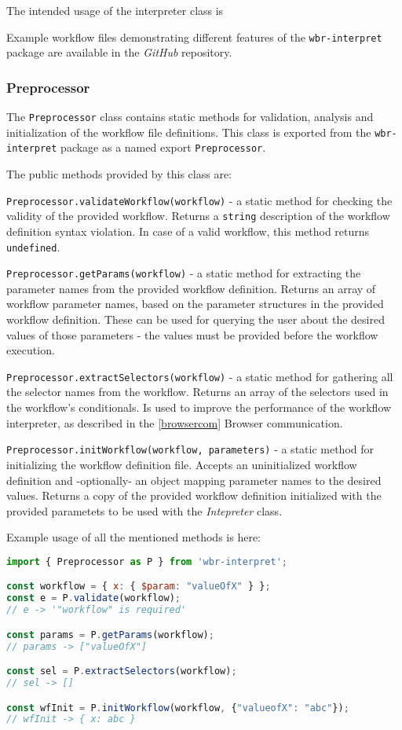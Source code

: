 The intended usage of the interpreter class is

Example workflow files demonstrating different features of the \texttt{wbr-interpret} package are available in the \textit{GitHub} repository.

\subsubsection{Preprocessor}

The \texttt{Preprocessor} class contains static methods for validation, analysis and initialization of the workflow file definitions.
This class is exported from the \texttt{wbr-interpret} package as a named export \texttt{Preprocessor}.

The public methods provided by this class are:
\smallskip

\texttt{Preprocessor.validateWorkflow(workflow)} - a static method for checking the validity of the provided workflow. 
Returns a \texttt{string} description of the workflow definition syntax violation.
In case of a valid workflow, this method returns \texttt{undefined}.
\smallskip

\texttt{Preprocessor.getParams(workflow)} - a static method for extracting the parameter names from the provided workflow definition.
Returns an array of workflow parameter names, based on the parameter structures in the provided workflow definition.
These can be used for querying the user about the desired values of those parameters - the values must be provided before the workflow execution.
\smallskip

\texttt{Preprocessor.extractSelectors(workflow)} - a static method for gathering all the selector names from the workflow. 
Returns an array of the selectors used in the workflow's conditionals.
Is used to improve the performance of the workflow interpreter, as described in the \autoref{browsercom} Browser communication.
\smallskip

\texttt{Preprocessor.initWorkflow(workflow, parameters)} - a static method for initializing the workflow definition file. 
Accepts an uninitialized workflow definition and -optionally- an object mapping parameter names to the desired values.
Returns a copy of the provided workflow definition initialized with the provided parametets to be used with the \textit{Intepreter} class.
\smallskip

Example usage of all the mentioned methods is here:

\begin{minipage}{0.95\linewidth}
    \begin{lstlisting}[language=javascript, columns=spaceflexible]
import { Preprocessor as P } from 'wbr-interpret';

const workflow = { x: { $param: "valueOfX" } };
const e = P.validate(workflow);
// e -> '"workflow" is required'

const params = P.getParams(workflow);
// params -> ["valueOfX"]

const sel = P.extractSelectors(workflow);
// sel -> []

const wfInit = P.initWorkflow(workflow, {"valueofX": "abc"});
// wfInit -> { x: abc }
    \end{lstlisting}
\end{minipage}